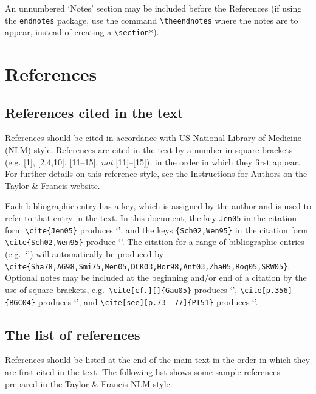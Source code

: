 \documentclass[]{interact}
\theoremstyle{plain}%
\theoremstyle{definition}
\theoremstyle{remark}
\begin{document}
An unnumbered `Notes' section may be included before the References (if using the \verb"endnotes" package, use the command \verb"\theendnotes" where the notes are to appear, instead of creating a \verb"\section*").


\section{References}

\subsection{References cited in the text}

References should be cited in accordance with US National Library of Medicine (NLM) style. References are cited in the text by a number in square brackets (e.g. [1], [2,4,10], [11--15], \emph{not} [11]--[15]), in the order in which they first appear. For further details on this reference style, see the Instructions for Authors on the Taylor \& Francis website.

Each bibliographic entry has a key, which is assigned by the author and is used to refer to that entry in the text. In this document, the key \verb"Jen05" in the citation form \verb"\cite{Jen05}" produces `\cite{Jen05}', and the keys \verb"{Sch02,Wen95}" in the citation form \verb"\cite{Sch02,Wen95}" produce `\cite{Sch02,Wen95}'. The citation for a range of bibliographic entries (e.g.\ `\cite{Sha78,AG98,Smi75,Men05,DCK03,Hor98,Ant03,Zha05,Rog05,SRW05}') will automatically be produced by  \verb"\cite{Sha78,AG98,Smi75,Men05,DCK03,Hor98,Ant03,Zha05,Rog05,SRW05}". Optional notes may be included at the beginning and/or end of a citation by the use of square brackets, e.g.\ \verb"\cite[cf.][]{Gau05}" produces `\cite[cf.][]{Gau05}', \verb"\cite[p.356]{BGC04}" produces `\cite[p.356]{BGC04}', and \verb"\cite[see][p.73-–77]{PI51}" produces `\cite[see][p.73--77]{PI51}'.


\subsection{The list of references}

References should be listed at the end of the main text in the order in which they are first cited in the text. The following list shows some sample references prepared in the Taylor \& Francis NLM style.
\end{document}
